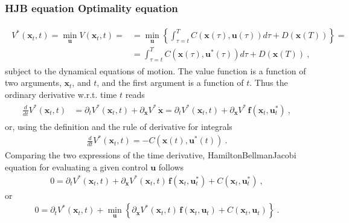 \documentclass[letterpaper,10pt,english]{jupyterBook}
\begin{document}
\subsubsection*{HJB equation \sphinxhyphen{} Optimality equation}
\begin{equation*}
\begin{split}\begin{aligned}
  V^*(\mathbf{x}_t, t) = \min_{\mathbf{u}} V(\mathbf{x}_t, t) =
  & = \min_{\mathbf{u}} \left\{ \int_{\tau=t}^{T} C(\mathbf{x}(\tau), \mathbf{u}(\tau)) d \tau +  D(\mathbf{x}(T)) \right\} = \\
  & =                           \int_{\tau=t}^{T} C(\mathbf{x}(\tau), \mathbf{u}^*(\tau)) d \tau +  D(\mathbf{x}(T)) \ ,
\end{aligned}\end{split}
\end{equation*}
\sphinxAtStartPar
subject to the dynamical equations of motion. The value function is a function of two arguments, \(\mathbf{x}_t\), and \(t\), and the first argument is a function of \(t\). Thus the ordinary derivative w.r.t. time \(t\) reads
\begin{equation*}
\begin{split}\begin{aligned}
  \frac{d}{dt} V^*(\mathbf{x}_t, t) 
  & = \partial_t V^*(\mathbf{x}_t,t) +  \partial_\mathbf{x} V^* \, \dot{\mathbf{x}}   
    = \partial_t V^*(\mathbf{x}_t,t) +  \partial_\mathbf{x} V^* \, \mathbf{f}(\mathbf{x}_t,\mathbf{u}^*_t) \ , 
\end{aligned}\end{split}
\end{equation*}
\sphinxAtStartPar
or, using the definition and the rule of derivative for integrals
\begin{equation*}
\begin{split}
  \frac{d}{dt} V^*(\mathbf{x}_t, t) = - C(\mathbf{x}(t), \mathbf{u}^*(t)) \ .
\end{split}
\end{equation*}
\sphinxAtStartPar
Comparing the two expressions of the time derivative, Hamilton\sphinxhyphen{}Bellman\sphinxhyphen{}Jacobi equation for evaluating a given control \(\mathbf{u}\) follows
\begin{equation*}
\begin{split}0 = \partial_t V^*(\mathbf{x}_t, t) + \partial_{\mathbf{x}} V^*(\mathbf{x}_t, t) \, \mathbf{f}(\mathbf{x}_t, \mathbf{u}^*_t) + C(\mathbf{x}_t, \mathbf{u}^*_t) \ ,\end{split}
\end{equation*}
\sphinxAtStartPar
or
\begin{equation*}
\begin{split}0 = \partial_t V^*(\mathbf{x}_t, t) + \min_{\mathbf{u}} \left\{ \partial_{\mathbf{x}} V^*(\mathbf{x}_t, t) \, \mathbf{f}(\mathbf{x}_t, \mathbf{u}_t) + C(\mathbf{x}_t, \mathbf{u}_t) \right\} \ .\end{split}
\end{equation*}
\sphinxstepscope
\end{document}
